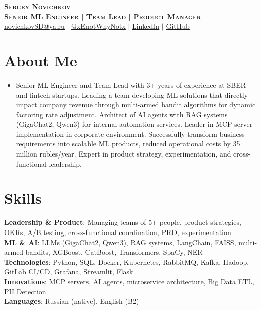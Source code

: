 \documentclass[letterpaper,11pt]{article}
\begin{document}
\begin{center}
    \textbf{\huge \scshape Sergey Novichkov} \\ \vspace{1pt}
    \textbf{\scshape Senior ML Engineer | Team Lead | Product Manager} \\
    \href{mailto:novichkovSD@ya.ru}{\uline{novichkovSD@ya.ru}} $|$ \href{https://t.me/xEnotWhyNotx}{\uline{@xEnotWhyNotx}} $|$ \href{https://linkedin.com/in/xEnotWhyNotx}{\uline{LinkedIn}} $|$ \href{https://github.com/xEnotWhyNotx}{\uline{GitHub}}
    \vspace{-20pt}
\end{center}

\section{About Me}
\begin{itemize}[leftmargin=0.15in, label={}]
    \item \vspace{-5pt} 
    Senior ML Engineer and Team Lead with 3+ years of experience at SBER and fintech startups. Leading a team developing ML solutions that directly impact company revenue through multi-armed bandit algorithms for dynamic factoring rate adjustment. Architect of AI agents with RAG systems (GigaChat2, Qwen3) for internal automation services. Leader in MCP server implementation in corporate environment. Successfully transform business requirements into scalable ML products, reduced operational costs by 35 million rubles/year. Expert in product strategy, experimentation, and cross-functional leadership.
    \vspace{-15pt}
\end{itemize}

\section{Skills}
\begin{itemize}[leftmargin=0.15in, label={}]
    \small{\item{
        \vspace{-5pt}
        \textbf{Leadership \& Product}: Managing teams of 5+ people, product strategies, OKRs, A/B testing, cross-functional coordination, PRD, experimentation \\
        \textbf{ML \& AI}: LLMs (GigaChat2, Qwen3), RAG systems, LangChain, FAISS, multi-armed bandits, XGBoost, CatBoost, Transformers, SpaCy, NER \\
        \textbf{Technologies}: Python, SQL, Docker, Kubernetes, RabbitMQ, Kafka, Hadoop, GitLab CI/CD, Grafana, Streamlit, Flask \\
        \textbf{Innovations}: MCP servers, AI agents, microservice architecture, Big Data ETL, PII Detection \\
        \textbf{Languages}: Russian (native), English (B2)
        \vspace{-15pt}
    }}
\end{itemize}
\end{document}
